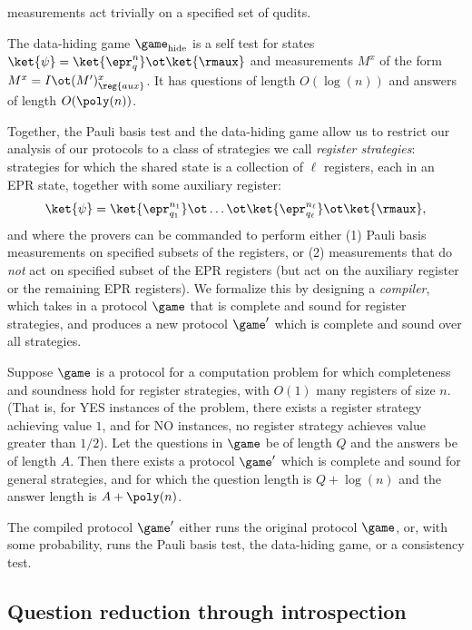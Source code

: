 measurements act trivially on a specified set of qudits.
\begin{infthm}
  The data-hiding game $\game_{\mathrm{hide}}$ is a self test for
  states $\ket{\psi} = \ket{\epr_q^n} \ot \ket{\rmaux}$ and
  measurements $M^x$ of the form $M^x = I \ot (M')^x_{\reg{aux}}$. It
  has questions of length $O(\log(n))$ and answers of length $O(\poly(n))$.
\end{infthm}
Together, the Pauli basis test and the data-hiding game allow us to restrict our analysis of our protocols to a
class of strategies we call \emph{register strategies}: strategies for
which the shared state is a collection of $\ell$ registers, each in an
EPR state, together with some auxiliary register:
\[ \ket{\psi} = \ket{\epr_{q_1}^{n_1}} \ot \dots \ot
  \ket{\epr_{q_\ell}^{n_\ell}} \ot \ket{\rmaux}, \]
and where the provers can be commanded to perform either (1) Pauli basis measurements on specified subsets of the
registers, or (2) measurements that do \emph{not} act on specified
subset of the EPR registers (but act on the auxiliary register or the
remaining EPR registers). We formalize this by designing a \emph{compiler},
which takes in a protocol $\game$ that is complete and sound for register
strategies, and produces a new protocol $\game'$ which is complete and
sound over all strategies.
\begin{infthm}\label{thm:compileroonie}
  Suppose $\game$ is a protocol for a computation problem for which completeness and soundness
  hold for register strategies, with $O(1)$ many registers of size
  $n$. (That is, for YES instances of the problem, there exists a
  register strategy achieving value $1$, and for NO instances, no
  register strategy achieves value greater than $1/2$). Let the
  questions in $\game$ be of length $Q$ and the answers be of length
  $A$. Then there exists a protocol $\game'$ which is complete and
  sound for general strategies, and for which the question length is $Q
  + \log(n)$ and the answer length is $A + \poly(n)$.
\end{infthm}
The compiled protocol $\game'$ either runs the original protocol
$\game$, or, with some probability, runs the Pauli basis test, the
data-hiding game, or a consistency test.


\subsection{Question reduction through introspection}

